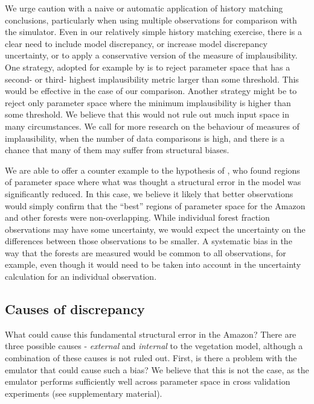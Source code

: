 \documentclass[esd, manuscript]{copernicus}
\begin{document}
We urge caution with a naive or automatic application of history matching conclusions, particularly when using multiple observations for comparison with the simulator. Even in our relatively simple history matching exercise, there is a clear need to include model discrepancy, or increase model discrepancy uncertainty, or to apply a conservative version of the measure of implausibility. One strategy, adopted for example by \cite{vernon2014observable} is to reject parameter space that has a second- or third- highest implausibility metric larger than some threshold. This would be effective in the case of our comparison. Another strategy might be to reject only parameter space where the minimum implausibility is higher than some threshold. We believe that this would not rule out much input space in many circumstances. We call for more research on the behaviour of measures of implausibility, when the number of data comparisons is high, and there is a chance that many of them may suffer from structural biases. 

We are able to offer a counter example to the hypothesis of \citep{williamson2014identifying}, who found regions of parameter space where what was thought a structural error in the model was significantly reduced. In this case, we believe it likely that better observations would simply confirm that the “best” regions of parameter space for the Amazon and other forests were non-overlapping. While individual forest fraction observations may have some uncertainty, we would expect the uncertainty on the differences between those observations to be smaller. A systematic bias in the way that the forests are measured would be common to all observations, for example, even though it would need to be taken into account in the uncertainty calculation for an individual observation.

\subsection{Causes of discrepancy}\label{ssec:causes}
What could cause this fundamental structural error in the Amazon? There are three possible causes - \emph{external} and \emph{internal} to the vegetation model, although a combination of these causes is not ruled out. First, is there a problem with the emulator that could cause such a bias? We believe that this is not the case, as the emulator performs sufficiently well across parameter space in cross validation experiments (see supplementary material).
\end{document}
